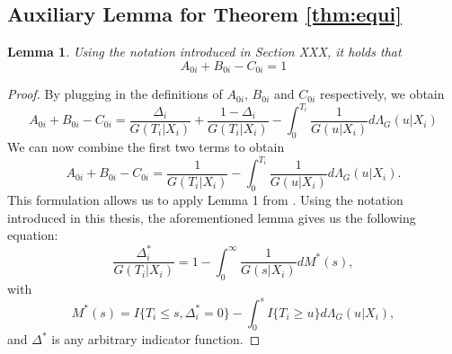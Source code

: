 \documentclass[12pt, a4paper]{scrartcl}
\theoremstyle{definition}
\theoremstyle{plain}
\newtheorem{Lemma}{Lemma}[section]
\numberwithin{equation}{section}
\numberwithin{figure}{section}
\numberwithin{table}{section}
\begin{document}
\begin{appendices}
		\subsection{Auxiliary Lemma for Theorem \ref{thm:equi}}\label{proof:strawderman}
		
		\begin{Lemma}\label{lem:equi}
			Using the notation introduced in Section XXX, it holds that 
			\begin{equation*}
				A_{0i}+B_{0i}-C_{0i}=1
			\end{equation*}
		\end{Lemma}
		\begin{proof}
			By plugging in the definitions of $A_{0i}$, $B_{0i}$ and $C_{0i}$ respectively, we obtain
			\begin{equation*}
			A_{0i}+B_{0i}-C_{0i} = \frac{\Delta_i}{G(T_i\vert X_i)} + \frac{1-\Delta_i}{G(T_i\vert X_i)} - \int_{0}^{T_i}\frac{1}{G(u\vert X_i)}d\Lambda_G(u\vert X_i)
			\end{equation*}
			We can now combine the first two terms to obtain
			\begin{equation}\label{eq:lemma}
			A_{0i}+B_{0i}-C_{0i} = \frac{1}{G(T_i \vert X_i)} - \int_{0}^{T_i}\frac{1}{G(u\vert X_i)}d\Lambda_G(u\vert X_i).
			\end{equation}
			This formulation allows us to apply Lemma 1 from \citet*{strawderman}.
			Using the notation introduced in this thesis, the aforementioned lemma gives us the following equation:
			\begin{equation}\label{eq:straw}
			\frac{\Delta^*_i}{G(T_i\vert X_i)} = 1 - \int_{0}^{\infty} \frac{1}{G(s\vert X_i)} dM^*(s),
			\end{equation}
			with
			\begin{equation*}
			M^*(s) = I\{T_i \leq s, \Delta^*_i=0\} - \int_{0}^s I\{T_i\geq u\}d\Lambda_G(u\vert X_i),
			\end{equation*}
			and $\Delta^*$ is any arbitrary indicator function.
			

\end{proof}
\end{appendices}
\end{document}

